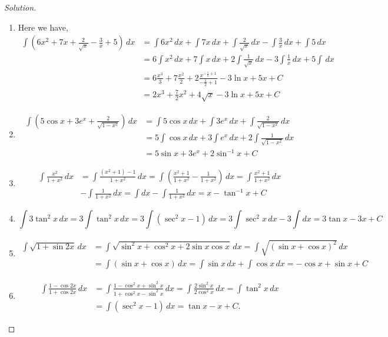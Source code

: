 \documentclass{book}
\theoremstyle{definition}
\newenvironment{solution}
    {\begin{proof}[Solution]}
    {\end{proof}}
\begin{document}
\begin{solution}
\begin{enumerate}[label=(\roman*)]
\item Here we have,
\begin{align*}
    \int (6x^2+7x+\frac{2}{\sqrt{x}}-\frac{3}{x}+5) \, dx &= \int6x^2 \, dx+\int 7x \, dx+\int\frac{2}{\sqrt{x}} \, dx-\int\frac{3}{x} \, dx+\int5 \, dx \\
    &= 6\int x^2 \, dx+7\int x \, dx+2\int\frac{1}{\sqrt{x}} \, dx-3\int\frac{1}{x} \, dx+5\int  \, dx \\ 
    &= 6\frac{x^3}{3}+7\frac{x^2}{2}+2\frac{x^{-\frac{1}{2}+1}}{-\frac{1}{2}+1}-3\ln x+5x+C \\ 
    &= 2x^3+\frac{7}{2}x^2+4\sqrt{x}-3\ln x+5x+C
\end{align*}

\item
\begin{align*}
    \int(5\cos x+3e^x+\frac{2}{\sqrt{1-x^2}}) \, dx &= \int5\cos x \, dx+\int 3e^x \, dx+\int \frac{2}{\sqrt{1-x^2}} \, dx \\ 
    &= 5\int \cos x \, dx+3\int e^x \, dx+2\int \frac{1}{\sqrt{1-x^2}} \, dx \\ 
    &= 5\sin x+3e^x+2\sin^{-1}x+C
\end{align*}

\item 
\begin{align*}
\int \frac{x^2}{1+x^2} \, dx &= \int \frac{(x^2+1)-1}{1+x^2} \, dx = \int(\frac{x^2+1}{1+x^2}-\frac{1}{1+x^2}) \, dx = \int\frac{x^2+1}{1+x^2} \, dx \\
& -\int \frac{1}{1+x^2} \, dx = \int dx-\int \frac{1}{1+x^2} \, dx = x-\tan^{-1}x+C
\end{align*}

\item 
\[
\int3\tan^2 x \, dx = 3\int \tan^2 x \, dx = 3\int (\sec^2 x-1) \, dx = 3\int \sec^2 x \, dx-3\int dx = 3\tan x-3x+C
\]

\item 
\begin{align*}
\int \sqrt{1+\sin 2x} \, dx &= \int \sqrt{\sin^2 x+\cos^2 x+2\sin x \cos x} \, dx = \int \sqrt{(\sin x+\cos x)^2} \, dx \\ 
&= \int {(\sin x+\cos x)} \, dx = \int \sin x \, dx+\int \cos x \, dx = -\cos x+\sin x+C
\end{align*}

\item 
\begin{align*}
\int\frac{1-\cos 2x}{1+\cos 2x} \, dx &= \int\frac{1-\cos^2x+\sin^2x}{1+\cos^2x-\sin^2x} \, dx = \int\frac{2\sin^2x}{2\cos^2x} \, dx = \int \tan^2x \, dx \\
&= \int (\sec^2x-1) \, dx = \tan x-x+C.
\end{align*}


\end{enumerate}
\end{solution}
\end{document}
